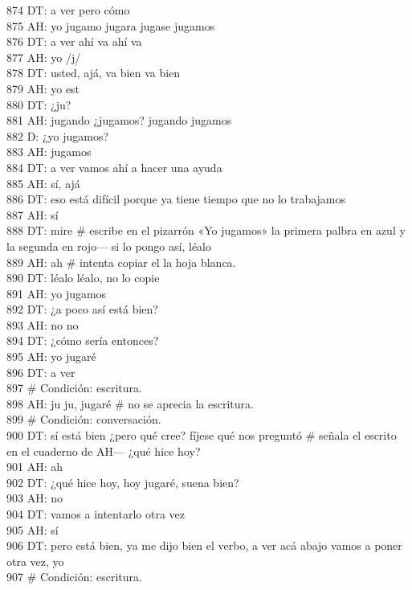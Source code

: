 874 DT: a ver pero cómo\\
875 AH: yo jugamo jugara jugase jugamos\\
876 DT: a ver ahí va ahí va\\
877 AH: yo /j/\\
878 DT: usted, ajá, va bien va bien\\
879 AH: yo est\\
880 DT: ¿ju?\\
881 AH: jugando ¿jugamos? jugando jugamos\\
882 D: ¿yo jugamos?\\
883 AH: jugamos\\
884 DT: a ver vamos ahí a hacer una ayuda\\
885 AH: sí, ajá\\
886 DT: eso está difícil porque ya tiene tiempo que no lo trabajamos\\
887 AH: sí\\
888 DT: mire \# escribe en el pizarrón «Yo jugamos» la primera palbra en azul y la segunda en rojo--- si lo pongo así, léalo\\
889 AH: ah \# intenta copiar el la hoja blanca.\\
890 DT: léalo léalo, no lo copie\\
891 AH: yo jugamos\\
892 DT: ¿a poco así está bien?\\
893 AH: no no\\
894 DT: ¿cómo sería entonces?\\
895 AH: yo jugaré\\
896 DT: a ver\\
897 \# Condición: escritura.\\
898 AH: ju ju, jugaré \# no se aprecia la escritura.\\
899 \# Condición: conversación.\\
900 DT: sí está bien ¿pero qué cree? fíjese qué nos preguntó \# señala el escrito en el cuaderno de AH--- ¿qué hice hoy?\\
901 AH: ah\\
902 DT: ¿qué hice hoy, hoy jugaré, suena bien?\\
903 AH: no\\
904 DT: vamos a intentarlo otra vez\\
905 AH: sí\\
906 DT: pero está bien, ya me dijo bien el verbo, a ver acá abajo vamos a poner otra vez, yo\\
907 \# Condición: escritura.\\
